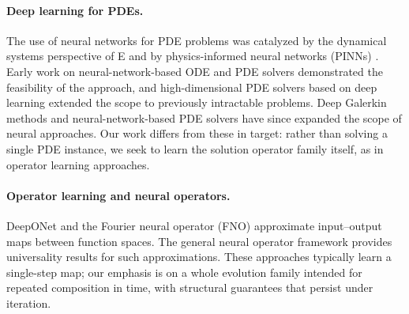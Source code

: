\documentclass[hidelinks,review,nohypdvips,onefignum,onetabnum]{siamart220329}
\newcounter{problem}[section]
\begin{document}
\paragraph{Deep learning for PDEs.}
The use of neural networks for PDE problems was catalyzed by the dynamical systems perspective of E \cite{E2017Proposal} and by physics-informed neural networks (PINNs) \cite{RaissiPerdikarisKarniadakis2019PINNs}. Early work on neural-network-based ODE and PDE solvers \cite{LagarisFotiadis1998} demonstrated the feasibility of the approach, and high-dimensional PDE solvers based on deep learning \cite{HanJentzenE2018} extended the scope to previously intractable problems. Deep Galerkin methods \cite{SirignanoSpiliopoulos2018DGM} and neural-network-based PDE solvers \cite{RuthottoHaber2020DeepPDE} have since expanded the scope of neural approaches. Our work differs from these in target: rather than solving a single PDE instance, we seek to learn the solution operator family itself, as in operator learning approaches.

\paragraph{Operator learning and neural operators.}
DeepONet \cite{LuJinKarniadakis2021DeepONet,LuLu2020DeepONet} and the Fourier neural operator (FNO) \cite{LiKovachkiAzizzadenesheliEtAl2021FNO} approximate input--output maps between function spaces. The general neural operator framework \cite{KovachkiLiLiuEtAl2023NeuralOperator} provides universality results for such approximations. These approaches typically learn a single-step map; our emphasis is on a whole evolution family intended for repeated composition in time, with structural guarantees that persist under iteration.
\end{document}

